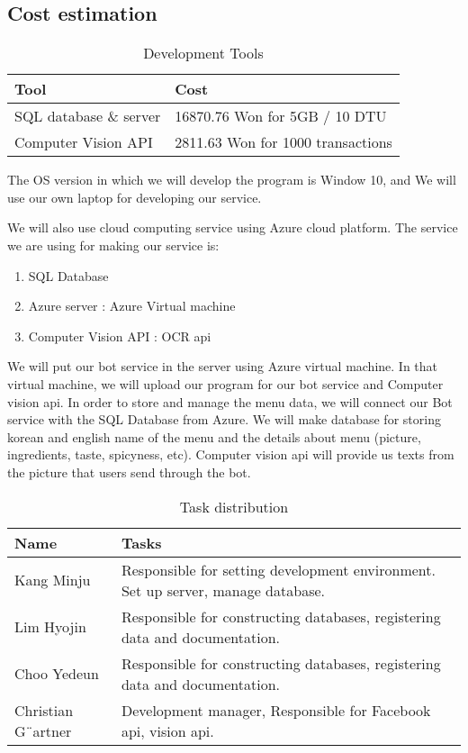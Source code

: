 \subsection{Cost estimation}
\begin{table}[htb]
\caption{Development Tools}
\begin{tabularx}{\linewidth}{|X|X|}
\toprule
Tool & Cost \\
\midrule
SQL database \& server & 16870.76 Won  for 5GB / 10 DTU\\
Computer Vision API & 2811.63 Won for 1000 transactions\\
\end{tabularx}
\end{table}
\FloatBarrier

The OS version in which we will develop the program is Window 10, and We will use our own laptop for developing our service.

We will also use cloud computing service using Azure cloud platform. 
The service we are using for making our service is:
\begin{enumerate}
\item SQL Database 
\item Azure server : Azure Virtual machine
\item Computer Vision API : OCR api
\end{enumerate}
We will put our bot service in the server using Azure virtual machine. In that virtual machine, we will upload our program for our bot service and Computer vision api.  
In order to store and manage the menu data, we will connect our Bot service with the SQL Database from Azure. We will make database for storing korean and english name of the menu and the details about menu (picture, ingredients, taste, spicyness, etc).
Computer vision api will provide us texts from the picture that users send through the bot.

\begin{table}[htb]
\caption{Task distribution}
\begin{tabularx}{\linewidth}{|X|X|}
\toprule
Name & Tasks \\
\midrule
Kang Minju  & Responsible for setting development environment. Set up server, manage database.\\
Lim Hyojin & Responsible for constructing databases, registering data and documentation.\\
Choo Yedeun & Responsible for constructing databases, registering data and documentation.\\
Christian G¨artner & Development manager, Responsible for Facebook api, vision api.
\end{tabularx}
\end{table}
\FloatBarrier
